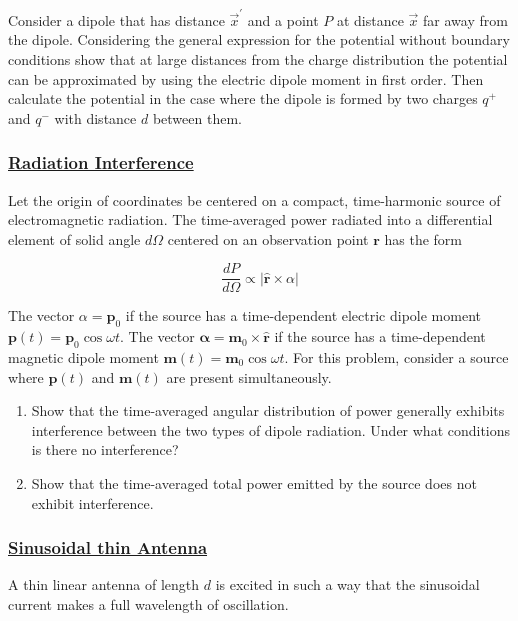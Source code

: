 Consider a dipole that has distance $\vec{x}^{\prime}$ and a point $P$ at distance $\vec{x}$ far away from the dipole. Considering the general expression for the potential without boundary conditions show that at large distances from the charge distribution the potential can be approximated by using the electric dipole moment in first order. Then calculate the potential in the case where the dipole is formed by two charges $q^{+}$ and $q^{-}$ with distance $d$ between them.

\subsubsection{\hyperref[Radiation Interference]{Radiation Interference}}

Let the origin of coordinates be centered on a compact, time-harmonic source of electromagnetic radiation. The time-averaged power radiated into a differential element of solid angle $d \Omega$ centered on an observation point $\mathbf{r}$ has the form

\begin{equation}
	\frac{d P}{d \Omega} \propto|\hat{\mathbf{r}} \times \alpha|
\end{equation}

The vector $\alpha=\mathbf{p}_{0}$ if the source has a time-dependent electric dipole moment $\mathbf{p}(t)=\mathbf{p}_{0} \cos \omega t .$ The vector $\boldsymbol{\alpha}=\mathbf{m}_{0} \times \hat{\mathbf{r}}$ if the source has a time-dependent magnetic dipole moment $\mathbf{m}(t)=\mathbf{m}_{0} \cos \omega t .$ For this problem, consider a source where $\mathbf{p}(t)$ and $\mathbf{m}(t)$ are present simultaneously.

\begin{enumerate}
	\item Show that the time-averaged angular distribution of power generally exhibits interference between the two types of dipole radiation. Under what conditions is there no interference?
	\item Show that the time-averaged total power emitted by the source does not exhibit interference.
\end{enumerate}

\subsubsection{\hyperref[Sinusoidal thin Antenna]{Sinusoidal thin Antenna}}

A thin linear antenna of length $d$ is excited in such a way that the sinusoidal current makes a full wavelength of oscillation.

